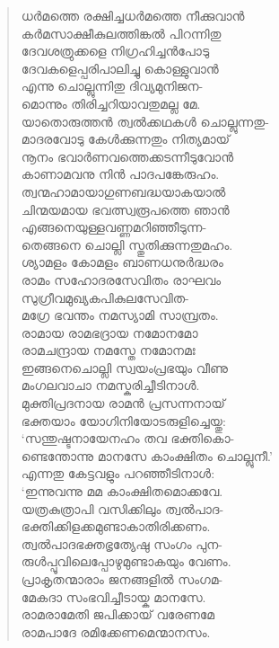 \begin{verse}
ധര്‍മത്തെ രക്ഷിച്ചധര്‍മത്തെ നീക്കുവാന്‍\\
കര്‍മസാക്ഷീകുലത്തിങ്കല്‍ പിറന്നിതു\\
ദേവശത്രുക്കളെ നിഗ്രഹിച്ചന്‍പോടു\\
ദേവകളെപ്പരിപാലിച്ചു കൊള്ളുവാന്‍\\
എന്നു ചൊല്ലുന്നിതു ദിവ്യമുനിജന-\\
മൊന്നും തിരിച്ചറിയാവതുമല്ല മേ.\\
യാതൊരുത്തന്‍ ത്വല്‍ക്കഥകള്‍ ചൊല്ലുന്നതു-\\
മാദരവോടു കേള്‍ക്കുന്നതും നിത്യമായ്\\
നൂനം ഭവാര്‍ണവത്തെക്കടന്നീടുവോന്‍\\
കാണാമവനു നിന്‍ പാദപങ്കേരുഹം.\\
ത്വന്മഹാമായാഗുണബദ്ധയാകയാല്‍\\
ചിന്മയമായ ഭവത്സ്വരൂപത്തെ ഞാന്‍\\
എങ്ങനെയുള്ളവണ്ണമറിഞ്ഞീടുന്ന-\\
തെങ്ങനെ ചൊല്ലി സ്തുതിക്കുന്നതുമഹം.\\
ശ്യാമളം കോമളം ബാണധനുര്‍ദ്ധരം\\
രാമം സഹോദരസേവിതം രാഘവം\\
സുഗ്രീവമുഖ്യകപികുലസേവിത-\\
മഗ്രേ ഭവന്തം നമസ്യാമി സാമ്പ്രതം.\\
രാമായ രാമഭദ്രായ നമോനമോ\\
രാമചന്ദ്രായ നമസ്തേ നമോനമഃ\\
ഇങ്ങനെചൊല്ലി സ്വയംപ്രഭയും വീണു\\
മംഗലവാചാ നമസ്കരിച്ചീടിനാള്‍.\\
മുക്തിപ്രദനായ രാമന്‍ പ്രസന്നനായ്\\
ഭക്തയാം യോഗിനിയോടരുളിച്ചെയ്തു:\\
‘സന്തുഷ്ടനായേനഹം തവ ഭക്തികൊ-\\
ണ്ടെന്തോന്നു മാനസേ കാംക്ഷിതം ചൊല്ലുനീ.’\\
എന്നതു കേട്ടവളും പറഞ്ഞീടിനാള്‍:\\
‘ഇന്നുവന്നു മമ കാംക്ഷിതമൊക്കവേ.\\
യത്രകുത്രാപി വസിക്കിലും ത്വല്‍പാദ-\\
ഭക്തിക്കിളക്കമുണ്ടാകാതിരിക്കണം.\\
ത്വല്‍പാദഭക്തഭൃത്യേഷു സംഗം പുന-\\
രുള്‍പ്പൂവിലെപ്പോഴുമുണ്ടാകയും വേണം.\\
പ്രാകൃതന്മാരാം ജനങ്ങളില്‍ സംഗമ-\\
മേകദാ സംഭവിച്ചീടായ്ക മാനസേ.\\
രാമരാമേതി ജപിക്കായ് വരേണമേ\\
രാമപാദേ രമിക്കേണമെന്മാനസം.\\

\end{verse}
